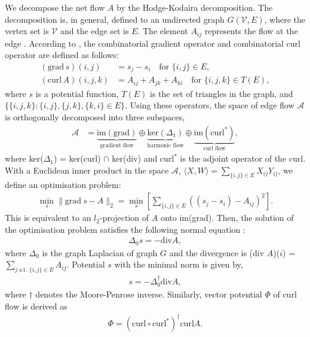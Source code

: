 \documentclass[]{article}
\begin{document}
We decompose the net flow $A$ by the Hodge-Kodaira decomposition.
The decomposition is, in general, defined to an undirected graph $G(\mathcal{V},E)$,
where the vertex set is $\mathcal{V}$ and the edge set is $E$.
%
The element  $A_{ij}$ represents the flow at the edge \cite{Jiang2011}.
According to \cite{Jiang2011}, the combinatorial gradient operator and  combinatorial curl operator are defined as follows:
\begin{align}
  (\text{grad}\, s)(i, j) &=  s_j-s_i \quad \text{for $\{i,j\} \in E$} \label{grad}, \\
  (\text{curl}\, A)(i, j, k) &= A_{ij} + A_{jk}+A_{ki}\quad \text{for $\{i,j,k\} \in T(E)$} \label{curl},
\end{align}
where $s$ is a potential function, $T(E)$ is the set of triangles in the graph, and $\{\{i, j, k\}: \{i, j\}, \{j, k\}, \{k, i\} \in E\}$.
Using these operators, the space of edge flow $\mathcal{A}$ is 
orthogonally decomposed into three subspaces,
\begin{align}
  \mathcal{A}  
  &= \underbrace{\text{im}(\text{grad})}_{\text{gradient flow}} \oplus \underbrace{\text{ker}(\Delta_1)}_{\text{harmonic flow}} \oplus \underbrace{\text{im}(\text{curl}^*)}_{\text{curl flow}},
\end{align}
where ker($\Delta_1$) = ker(curl) $\cap$ ker(div) and $\text{curl}^*$ is the adjoint operator of the curl.
With a Euclidean inner product in  the space $\mathcal{A}$, $\langle X,W\rangle = \sum_{ \{i,j\} \in E} X_{ij}Y_{ij}$,
we define an optimisation problem:
\begin{align}
  \min_s  \lVert   \text{grad}\ s - A \rVert_2 = \min_s \left[ \sum_{\{i,j\} \in E} \left( (s_j - s_i) - A_{ij} \right)^
  2 \right]  \label{eq:optimization_problem_general}.
\end{align}
This is equivalent to an $l_2$-projection of $A$ onto im(grad).
Then, the solution of the optimisation problem satisfies the following normal equation \cite{Jiang2011}:
\begin{align}
  \Delta_0 s = -  \text{div} A,
\end{align}
where $\Delta_0$ is the graph Laplacian of graph $G$ and the divergence is (div $A$)($i$) = $\sum_{j \text{ s.t. } \{i,j\} \in E} A_{ij}$. 
Potential $s$ with the minimal norm is given by,
%
%
\begin{align}
  s = - \Delta_0^{\dagger} \text{div} A,  \label{eq:scalar_potential}
\end{align}
where $\dagger$ denotes the Moore-Penrose inverse.
Similarly, vector potential $\Phi$ of curl flow is derived as
\begin{align}
  \Phi =(\mathrm{curl} \circ \mathrm{curl}^{*} )^{\dagger} \mathrm{curl} A. \label{eq:vector_potential}
\end{align}
\end{document}
